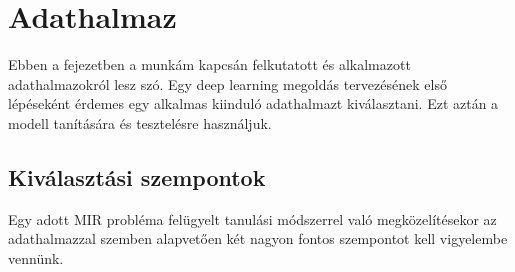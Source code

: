 \chapter{Adathalmaz}
\label{ch:dataset}

Ebben a fejezetben a munkám kapcsán felkutatott és alkalmazott adathalmazokról lesz szó. Egy deep learning megoldás tervezésének első lépéseként érdemes egy alkalmas kiinduló adathalmazt kiválasztani. Ezt aztán a modell tanítására és tesztelésre használjuk.

\section{Kiválasztási szempontok}

Egy adott MIR probléma felügyelt tanulási módszerrel való megközelítésekor az adathalmazzal szemben alapvetően két nagyon fontos szempontot kell vigyelembe vennünk.
